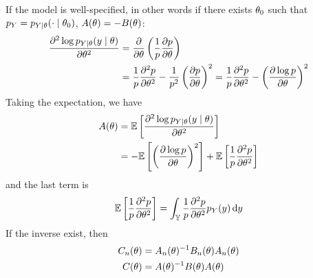 \documentclass[../../Main_ManuscritThese.tex]{subfiles}
\begin{document}
  If the model is well-specified, in other words if there exists $\theta_0$ such that $p_Y = p_{Y\mid \theta}(\cdot \mid\theta_0)$, $A(\theta) = -B(\theta)$:
  \begin{align}
    \frac{\partial^2 \log p_{Y\mid \theta}(y \mid \theta)}{\partial \theta^2} &= \frac{\partial }{\partial \theta}\left(\frac{1}{p}\frac{\partial p}{\partial \theta}\right) \\
    &= \frac{1}{p}\frac{\partial^2 p}{\partial \theta^2} - \frac{1}{p^2}\left(\frac{\partial p}{\partial \theta}\right)^2 = \frac{1}{p}\frac{\partial^2 p}{\partial \theta^2} - \left(\frac{\partial \log p}{\partial \theta}\right)^2
  \end{align}
  Taking the expectation, we have
  \begin{align}
    A(\theta) &= \mathbb{E}\left[\frac{\partial^2 \log p_{Y\mid \theta}(y \mid \theta)}{\partial \theta^2}\right] \\
           &= -\mathbb{E}\left[\left(\frac{\partial \log p}{\partial \theta}\right)^2\right] + \mathbb{E}\left[\frac{1}{p}\frac{\partial^2 p}{\partial \theta^2}\right]
  \end{align}
  and the last term is
  \begin{align}
     \mathbb{E}\left[\frac{1}{p}\frac{\partial^2 p}{\partial \theta^2}\right] = \int_{\mathbb{Y}} \frac{1}{p}\frac{\partial^2 p}{\partial \theta^2} p_{Y}(y) \,\mathrm{d}y
  \end{align}
  If the inverse exist,
  then
  \begin{align}
    C_n(\theta) &= A_n(\theta)^{-1} B_n(\theta) A_n(\theta) \\
    C(\theta) &= A(\theta)^{-1}B(\theta)A(\theta) \\
  \end{align}

\minitoc
\pagestyle{appendixStyle}



\subfileLocal{
	\pagestyle{empty}
	
	

}

\endgroup
\end{document}
